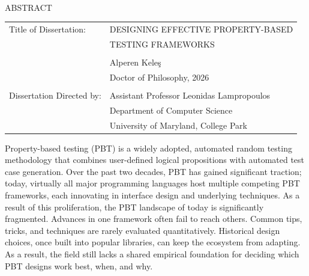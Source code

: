 
\hbox{\ } \vspace{.7in}
\renewcommand{\baselinestretch}{1}
\small \normalsize

\begin{center}
    \large{{ABSTRACT}}

    \vspace{3em}

\end{center}
\hspace{-.15in}
\begin{tabular}{ll}
    Title of Dissertation:    & {\large DESIGNING EFFECTIVE PROPERTY-BASED}        \\
                              & {\large TESTING FRAMEWORKS}                        \\
    \multicolumn{2}{l}{}                                                           \\
                              & {\large Alperen Keleş}                             \\
                              & {\large Doctor of Philosophy, 2026}                \\
    \multicolumn{2}{l}{}                                                           \\
    Dissertation Directed by: & {\large Assistant Professor Leonidas Lampropoulos} \\
                              & {\large Department of Computer Science }           \\
                              & {\large University of Maryland, College Park }     \\
\end{tabular}

\vspace{3em}

\renewcommand{\baselinestretch}{2}
\large \normalsize

Property-based testing (PBT) is a widely adopted, automated random testing methodology
that combines user-defined logical propositions with automated test case generation.
%
Over the past two decades, PBT has gained significant traction; today, virtually all
major programming languages host multiple competing PBT frameworks, each innovating in
interface design and underlying techniques.
%
As a result of this proliferation, the PBT landscape of today is significantly
fragmented. Advances in one framework often fail to reach others. Common tips, tricks,
and techniques are rarely evaluated quantitatively. Historical design choices, once
built into popular libraries, can keep the ecosystem from adapting. As a result, the
field still lacks a shared empirical foundation for deciding which PBT designs work
best, when, and why.

